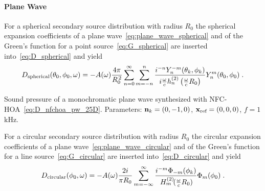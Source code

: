 \paragraph{Plane Wave}
%
%
For a spherical secondary source distribution with radius $R_0$ the spherical
expansion coefficients of a
plane wave~\eqref{eq:plane_wave_spherical} and of the Green's
function for a point source~\eqref{eq:G_spherical} are inserted
into~\eqref{eq:D_spherical} and yield\autocite[][(96)]{Schultz2014}
%
\begin{equation}
    D_\text{spherical}(\theta_0,\phi_0,\omega) = -A(\omega) \frac{4\pi}{R_0^{\,2}}
    \sum_{n=0}^\infty \sum_{m=-n}^n \frac{i^{-n} Y_n^{-m}(\theta_k,\phi_k)}{i\omegac h_n^{(2)}
    \left(\omegac R_0\right)} Y_n^m(\theta_0,\phi_0) \qp
    \label{eq:D_nfchoa_pw_3D}
\end{equation}
%
\begin{marginfigure}
    \centering
    \ft
    
    \caption{Sound pressure of a monochromatic plane wave synthesized with
        \twohalfD \ac{NFC-HOA}~\eqref{eq:D_nfchoa_pw_25D}. Parameters: $\mathbf{n}_k = (0,-1,0)$,
        $\mathbf{x}_\text{ref} = (0,0,0)$, $f = 1$\,kHz.
        }
\end{marginfigure}
%
For a circular secondary source distribution with radius $R_0$ the circular
expansion coefficients of a plane wave~\eqref{eq:plane_wave_circular} and
of the Green's function for a line source~\eqref{eq:G_circular} are
inserted into~\eqref{eq:D_circular} and
yield
%
\begin{equation}
    D_\text{circular}(\phi_0,\omega) = -A(\omega) \frac{2i}{\pi R_0}
    \sum_{m=-\infty}^\infty \frac{i^{-m}\Phi_{-m}(\phi_k)}
    {\H{m}{2}(\omegac R_0)} \Phi_m(\phi_0) \qp
    \label{eq:D_nfchoa_pw_2D}
\end{equation}
%

